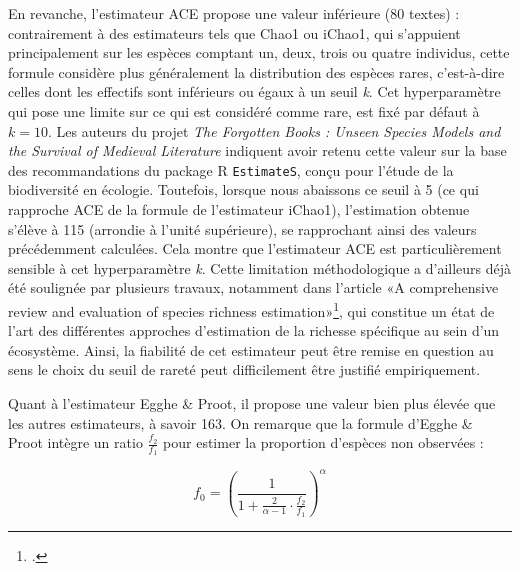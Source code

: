 \documentclass[a4paper,twoside,12pt]{book}
\begin{document}
En revanche, l’estimateur ACE propose une valeur inférieure (80 textes) : contrairement à des estimateurs tels que Chao1 ou iChao1, qui s’appuient principalement sur les espèces comptant un, deux, trois ou quatre individus, cette formule considère plus généralement la distribution des espèces rares, c’est-à-dire celles dont les effectifs sont inférieurs ou égaux à un seuil \textit{k}. Cet hyperparamètre qui pose une limite sur ce qui est considéré comme rare, est fixé par défaut à $k = 10$. Les auteurs du projet \textit{The Forgotten Books : Unseen Species Models and the Survival of Medieval Literature} indiquent avoir retenu cette valeur sur la base des recommandations du package R \texttt{EstimateS}, conçu  pour l’étude de la biodiversité en écologie. Toutefois, lorsque nous abaissons ce seuil à 5 (ce qui rapproche ACE de la formule de l’estimateur iChao1), l’estimation obtenue s’élève à 115 (arrondie à l’unité supérieure), se rapprochant ainsi des valeurs précédemment calculées. Cela montre que l’estimateur ACE est particulièrement sensible à cet hyperparamètre \textit{k}. Cette limitation méthodologique a d’ailleurs déjà été soulignée par plusieurs travaux, notamment dans l'article «A comprehensive review and evaluation of species richness estimation»\footcite[5]{Schmitz2025}, qui constitue un état de l’art des différentes approches d’estimation de la richesse spécifique au sein d’un écosystème. Ainsi, la fiabilité de cet estimateur peut être remise en question au sens le choix du seuil de rareté peut difficilement être justifié empiriquement.

Quant à l'estimateur Egghe \& Proot, il propose une valeur bien plus élevée que les autres estimateurs, à savoir 163. On remarque que la formule d’Egghe \& Proot intègre un ratio \( \frac{f_2}{f_1} \) pour estimer la proportion d’espèces non observées : 

\[
f_0 = \left( \frac{1}{1 + \frac{2}{\alpha - 1} \cdot \frac{f_2}{f_1}} \right)^\alpha
\]
\end{document}
